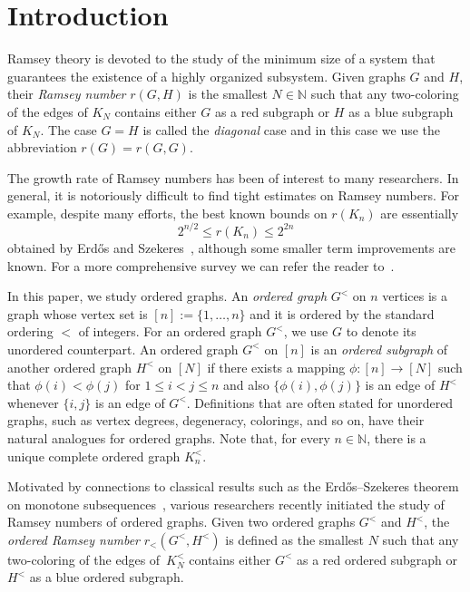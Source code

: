 \documentclass[11pt,a4paper]{article}
\theoremstyle{remark}
\begin{document}
\section{Introduction}
Ramsey theory is devoted to the study of the minimum size of a system that guarantees the existence of a highly organized subsystem. 
Given graphs $G$ and $H$, their \emph{Ramsey number} $r(G,H)$ is the smallest $N \in \mathbb{N}$ such that any two-coloring of the edges of $K_N$ contains either $G$ as a red subgraph or $H$ as a blue subgraph of $K_N$.
The case $G=H$ is called the \emph{diagonal} case and in this case we use the abbreviation $r(G) = r(G,G)$. 

The growth rate of Ramsey numbers has been of interest to many researchers.
In general, it is notoriously difficult to find tight estimates on Ramsey numbers.
For example, despite many efforts, the best known bounds on $r(K_n)$ are essentially
\begin{equation}
\label{eq-ramseyBounds}
2^{n/2} \leq r(K_n)\leq 2^{2n}
\end{equation}
obtained by Erd\H{o}s and Szekeres~\cite{erdosSzekeres35}, although some smaller term improvements are known.
For a more comprehensive survey we can refer the reader to~\cite{recent_developments}. 

In this paper, we study ordered graphs.
An \emph{ordered graph} $G^<$ on $n$ vertices is a graph whose vertex set is $[n]:=\{1,\dots, n\}$ and it is ordered by the standard ordering $<$ of integers.
For an ordered graph $G^<$, we use $G$ to denote its unordered counterpart.
An ordered graph $G^<$ on $[n]$ is an \emph{ordered subgraph} of another ordered graph $H^<$ on $[N]$ if there exists a mapping $\phi: [n] \rightarrow [N]$ such that $\phi(i) < \phi(j)$ for $1 \leq i < j \leq n$ and also $\{\phi(i),\phi(j)\}$ is an edge of $H^<$ whenever $\{i,j\}$ is an edge of $G^<$.
Definitions that are often stated for unordered graphs, such as vertex degrees, degeneracy, colorings, and so on, have their natural analogues for ordered graphs. Note that, for every $n\in\mathbb{N}$, there is a unique complete ordered graph $K^<_n$.

Motivated by connections to classical results such as the Erd\H{o}s--Szekeres theorem on monotone subsequences~\cite{erdosSzekeres35},
various researchers \cite{balko,conlon} recently initiated the study of Ramsey numbers of ordered graphs.
Given two ordered graphs $G^<$ and $H^<$, the \emph{ordered Ramsey number} $r_<(G^<,H^<)$ is defined as the smallest $N$ such that any two-coloring of the edges of~$K^<_N$ contains either $G^<$ as a red ordered subgraph or $H^<$ as a blue ordered subgraph.
\end{document}

